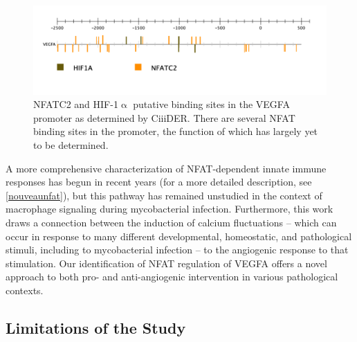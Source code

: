 \begin{figure}
\centering
\includegraphics[width=\textwidth]{images/vegfapromoter.pdf}
\caption[Putative NFATC2 and HIF\hyp{}1$\upalpha$ Binding Sites in the VEGFA promoter]{NFATC2 and HIF\hyp{}1$\upalpha$ putative binding sites in the VEGFA promoter as determined by CiiiDER. There are several NFAT binding sites in the promoter, the function of which has largely yet to be determined.}
\label{figure:promoter}
\end{figure}

A more comprehensive characterization of NFAT\hyp{}dependent innate immune responses has begun in recent years \citep{Deerhake2021, Peuker2022, Poli2022} (for a more detailed description, see \autoref{nouveaunfat}), but this pathway has remained unstudied in the context of macrophage signaling during mycobacterial infection. Furthermore, this work draws a connection between the induction of calcium fluctuations -- which can occur in response to many different developmental, homeostatic, and pathological stimuli, including to mycobacterial infection \citep{Kusner2001, Jayachandran2007, Jayachandran2008, Matty2019, Malik2000} -- to the angiogenic response to that stimulation. Our identification of NFAT regulation of VEGFA offers a novel approach to both pro\hyp{} and anti\hyp{}angiogenic intervention in various pathological contexts.

\subsection{Limitations of the Study}

